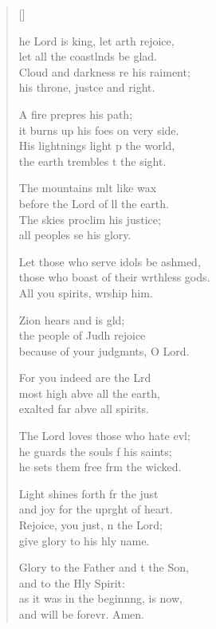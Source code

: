 \settowidth{\versewidth}{those who boast of their worthless gods. *}
\begin{verse}[\versewidth]
  \begin{patverse}
    he Lord is king, let arth rejoice,\Med\\
let all the coastlnds be glad.\\
Cloud and darkness re his raiment;\Med\\
his throne, just\pointup{\i}ce and right.

A fire prepres his path;\Med\\
it burns up his foes on very side.\\
His lightnings light p the world,\Med\\
the earth trembles t the sight.

The mountains mlt like wax\Med\\
before the Lord of ll the earth.\\
The skies proclim his justice;\Med\\
all peoples se his glory.

Let those who serve idols be ashmed,\Flex\\
those who boast of their wrthless gods.\Med\\
All you spirits, wrship him.

Zion hears and is gld;\Flex\\
the people of Judh rejoice\Med\\
because of your judgmnts, O Lord.

For you indeed are the Lrd\Flex\\
most high abve all the earth,\Med\\
exalted far abve all spirits.

The Lord loves those who hate ev\pointup{\i}l;\Flex\\
he guards the souls f his saints;\Med\\
he sets them free frm the wicked.

Light shines forth fr the just\Med\\
and joy for the upr\pointup{\i}ght of heart.\\
Rejoice, you just, \pointup{\i}n the Lord;\Med\\
give glory to his hly name.

Glory to the Father and t the Son,\Med\\
and to the Hly Spirit:\\
as it was in the beginn\pointup{\i}ng, is now,\Med\\
and will be forevr. Amen.
  \end{patverse}
\end{verse}
